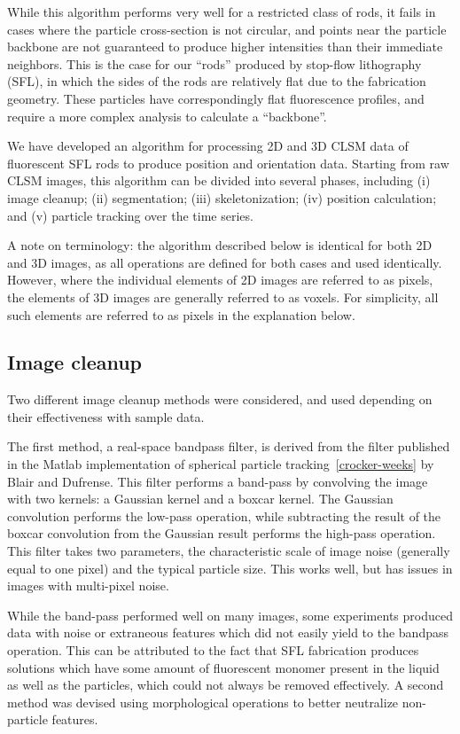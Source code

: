 While this algorithm performs very well for a restricted class of rods, it fails in cases where the particle
cross-section is not circular, and points near the particle backbone are not guaranteed to produce higher 
intensities than their immediate neighbors.  This is the case for our ``rods'' produced by stop-flow
lithography (SFL), in which the sides of the rods are relatively flat due to the fabrication
geometry. These particles have correspondingly flat fluorescence profiles, and require a more complex analysis
to calculate a ``backbone''.

We have developed an algorithm for processing 2D and 3D CLSM data of fluorescent SFL rods to
produce position and orientation data.  Starting from raw CLSM images, this algorithm can be divided
into several phases, including (i) image cleanup; (ii) segmentation; (iii) skeletonization;
(iv) position calculation; and
(v) particle tracking over the time series.  

A note on terminology: the algorithm described below is identical for both 2D and 3D images, as all
operations are defined for both cases and used identically. However, where the individual elements of
2D images are referred to as pixels, the elements of 3D images are generally referred to as voxels.
For simplicity, all such elements are referred to as pixels in the explanation below.

\subsection{Image cleanup}

Two different image cleanup methods were considered, and used depending on their effectiveness with
sample data.

The first method, a real-space bandpass filter, is derived from the filter published in the 
Matlab implementation of spherical particle tracking~\ref{crocker-weeks} by Blair and
Dufrense. This filter performs a band-pass by convolving the image with two kernels: 
a Gaussian kernel and a boxcar kernel.  The Gaussian convolution performs the low-pass
operation, while subtracting the result of the boxcar convolution from the Gaussian result
performs the high-pass operation. This filter takes two parameters, the characteristic scale
of image noise (generally equal to one pixel) and the typical particle size.  This works well,
but has issues in images with multi-pixel noise.

While the band-pass performed well on many images, some experiments produced data with noise or
extraneous features which did
not easily yield to the bandpass operation. This can be attributed to the fact that SFL fabrication produces
solutions which have some amount of fluorescent monomer present in the liquid as well as the particles, which
could not always be removed effectively.  A second method was devised using morphological
operations to better neutralize non-particle features.

